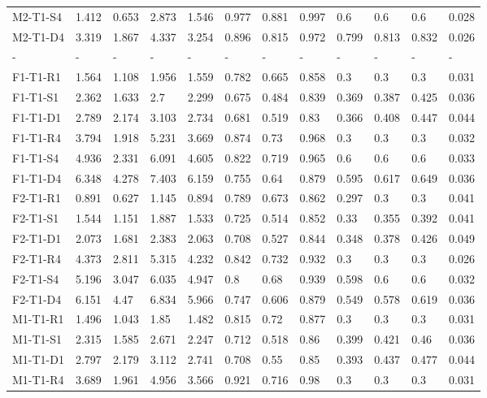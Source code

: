 \begin{table}[ht]
\begin{tabular}{llllllllllll}
  M2-T1-S4 & 1.412 & 0.653 & 2.873 & 1.546 & 0.977 & 0.881 & 0.997 & 0.6 & 0.6 & 0.6 &    0.028  \\ 
  M2-T1-D4 & 3.319 & 1.867 & 4.337 & 3.254 & 0.896 & 0.815 & 0.972 & 0.799 & 0.813 & 0.832 &    0.026  \\ 
  - & - & - & - & - & - & - & - & - & - & - & - \\ 
  F1-T1-R1 & 1.564 & 1.108 & 1.956 & 1.559 & 0.782 & 0.665 & 0.858 & 0.3 & 0.3 & 0.3 &    0.031  \\ 
  F1-T1-S1 & 2.362 & 1.633 & 2.7 & 2.299 & 0.675 & 0.484 & 0.839 & 0.369 & 0.387 & 0.425 &    0.036  \\ 
  F1-T1-D1 & 2.789 & 2.174 & 3.103 & 2.734 & 0.681 & 0.519 & 0.83 & 0.366 & 0.408 & 0.447 &    0.044  \\ 
  F1-T1-R4 & 3.794 & 1.918 & 5.231 & 3.669 & 0.874 & 0.73 & 0.968 & 0.3 & 0.3 & 0.3 &    0.032  \\ 
  F1-T1-S4 & 4.936 & 2.331 & 6.091 & 4.605 & 0.822 & 0.719 & 0.965 & 0.6 & 0.6 & 0.6 &    0.033  \\ 
  F1-T1-D4 & 6.348 & 4.278 & 7.403 & 6.159 & 0.755 & 0.64 & 0.879 & 0.595 & 0.617 & 0.649 &    0.036  \\ 
  F2-T1-R1 & 0.891 & 0.627 & 1.145 & 0.894 & 0.789 & 0.673 & 0.862 & 0.297 & 0.3 & 0.3 &    0.041  \\ 
  F2-T1-S1 & 1.544 & 1.151 & 1.887 & 1.533 & 0.725 & 0.514 & 0.852 & 0.33 & 0.355 & 0.392 &    0.041  \\ 
  F2-T1-D1 & 2.073 & 1.681 & 2.383 & 2.063 & 0.708 & 0.527 & 0.844 & 0.348 & 0.378 & 0.426 &    0.049  \\ 
  F2-T1-R4 & 4.373 & 2.811 & 5.315 & 4.232 & 0.842 & 0.732 & 0.932 & 0.3 & 0.3 & 0.3 &    0.026  \\ 
  F2-T1-S4 & 5.196 & 3.047 & 6.035 & 4.947 & 0.8 & 0.68 & 0.939 & 0.598 & 0.6 & 0.6 &    0.032  \\ 
  F2-T1-D4 & 6.151 & 4.47 & 6.834 & 5.966 & 0.747 & 0.606 & 0.879 & 0.549 & 0.578 & 0.619 &    0.036  \\ 
  M1-T1-R1 & 1.496 & 1.043 & 1.85 & 1.482 & 0.815 & 0.72 & 0.877 & 0.3 & 0.3 & 0.3 &    0.031  \\ 
  M1-T1-S1 & 2.315 & 1.585 & 2.671 & 2.247 & 0.712 & 0.518 & 0.86 & 0.399 & 0.421 & 0.46 &    0.036  \\ 
  M1-T1-D1 & 2.797 & 2.179 & 3.112 & 2.741 & 0.708 & 0.55 & 0.85 & 0.393 & 0.437 & 0.477 &    0.044  \\ 
  M1-T1-R4 & 3.689 & 1.961 & 4.956 & 3.566 & 0.921 & 0.716 & 0.98 & 0.3 & 0.3 & 0.3 &    0.031  \\ 

\end{tabular}
\end{table}
